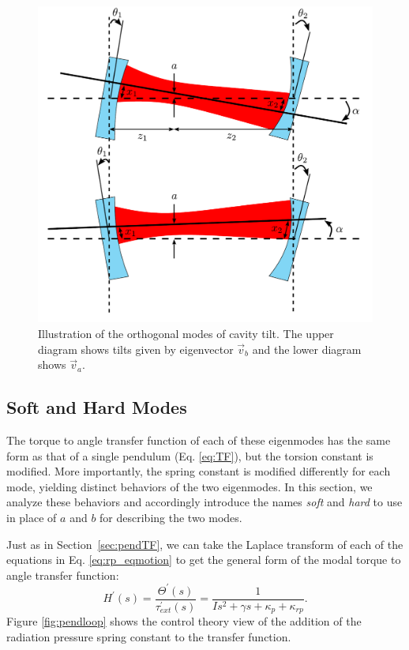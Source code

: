 \begin{figure}
\begin{centering}
\includegraphics[width=0.7\columnwidth]{figures/eigenmodes.pdf}
\caption[Illustration of the orthogonal modes of cavity
tilt]{Illustration of the orthogonal modes of cavity tilt. The upper
  diagram shows tilts given by eigenvector $\vec{v}_b$ and the lower
  diagram shows $\vec{v}_a$.}
\label{fig:ss}
\end{centering}
\end{figure}




\subsection{Soft and Hard Modes} 
The torque to angle transfer function of each of these eigenmodes has
the same form as that of a single pendulum (Eq. \ref{eq:TF}), but the
torsion constant is modified. More importantly, the spring constant is
modified differently for each mode, yielding distinct behaviors of the
two eigenmodes. In this section, we analyze these behaviors and
accordingly introduce the names \emph{soft} and \emph{hard} to use in
place of $a$ and $b$ for describing the two modes.

Just as in Section~\ref{sec:pendTF}, we can take the Laplace transform of
each of the equations in Eq. \ref{eq:rp_eqmotion} to get the general
form of the modal torque to angle transfer function:
\begin{equation}
H^\prime(s) = \frac{\Theta^\prime(s)}{\tau_{ext}^\prime(s)} = \frac{1}{I s^2 + \gamma s +
  \kappa_p + \kappa_{rp}}.
\label{eq:modalTF}
\end{equation} 
Figure \ref{fig:pendloop} shows the control theory view of
the addition of the radiation pressure spring constant to the transfer
function.

